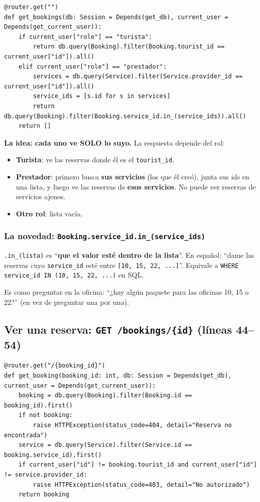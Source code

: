 \documentclass[11pt,a4paper]{article}
\begin{document}
\begin{lstlisting}
@router.get("")
def get_bookings(db: Session = Depends(get_db), current_user = Depends(get_current_user)):
    if current_user["role"] == "turista":
        return db.query(Booking).filter(Booking.tourist_id == current_user["id"]).all()
    elif current_user["role"] == "prestador":
        services = db.query(Service).filter(Service.provider_id == current_user["id"]).all()
        service_ids = [s.id for s in services]
        return db.query(Booking).filter(Booking.service_id.in_(service_ids)).all()
    return []
\end{lstlisting}

\textbf{La idea: cada uno ve SOLO lo suyo.} La respuesta depende del rol:

\begin{itemize}
    \item \textbf{Turista}: ve las reservas donde él es el \texttt{tourist\_id}.
    \item \textbf{Prestador}: primero busca \textbf{sus servicios} (los que él creó), junta sus ids
    en una lista, y luego ve las reservas de \textbf{esos servicios}. No puede ver reservas de
    servicios ajenos.
    \item \textbf{Otro rol}: lista vacía.
\end{itemize}

\subsubsection{La novedad: \texttt{Booking.service\_id.in\_(service\_ids)}}

\texttt{.in\_(lista)} es ``\textbf{que el valor esté dentro de la lista}''. En español: ``dame las
reservas cuyo \texttt{service\_id} esté entre \texttt{[10, 15, 22, ...]}''. Equivale a
\texttt{WHERE service\_id IN (10, 15, 22, ...)} en SQL.

\begin{analogia}
Es como preguntar en la oficina: ``¿hay algún paquete para las oficinas 10, 15 o 22?''
(en vez de preguntar una por una).
\end{analogia}

\subsection{Ver una reserva: \texttt{GET /bookings/\{id\}} (líneas 44--54)}

\begin{lstlisting}
@router.get("/{booking_id}")
def get_booking(booking_id: int, db: Session = Depends(get_db), current_user = Depends(get_current_user)):
    booking = db.query(Booking).filter(Booking.id == booking_id).first()
    if not booking:
        raise HTTPException(status_code=404, detail="Reserva no encontrada")
    service = db.query(Service).filter(Service.id == booking.service_id).first()
    if current_user["id"] != booking.tourist_id and current_user["id"] != service.provider_id:
        raise HTTPException(status_code=403, detail="No autorizado")
    return booking
\end{lstlisting}
\end{document}
